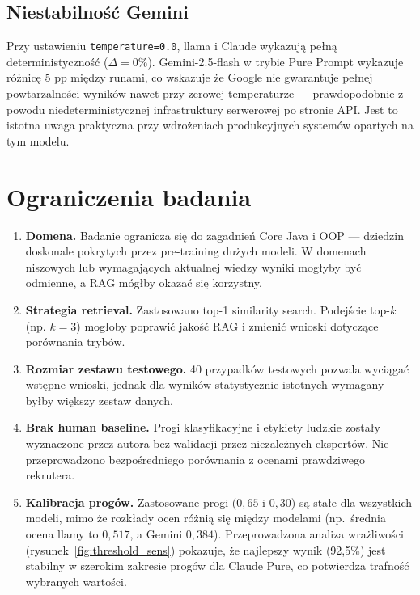 \documentclass[12pt, a4paper]{article}
\begin{document}
\subsection{Niestabilność Gemini}

Przy ustawieniu \texttt{temperature=0.0}, llama i Claude wykazują pełną deterministyczność
($\Delta = 0\%$). Gemini-2.5-flash w trybie Pure Prompt wykazuje różnicę 5 pp między
runami, co wskazuje że Google nie gwarantuje pełnej powtarzalności wyników nawet
przy zerowej temperaturze — prawdopodobnie z powodu niedeterministycznej infrastruktury
serwerowej po stronie API. Jest to istotna uwaga praktyczna przy wdrożeniach
produkcyjnych systemów opartych na tym modelu.

\section{Ograniczenia badania}

\begin{enumerate}
    \item \textbf{Domena.} Badanie ogranicza się do zagadnień Core Java i OOP —
          dziedzin doskonale pokrytych przez pre-training dużych modeli.
          W domenach niszowych lub wymagających aktualnej wiedzy wyniki
          mogłyby być odmienne, a RAG mógłby okazać się korzystny.

    \item \textbf{Strategia retrieval.} Zastosowano top-1 similarity search.
          Podejście top-$k$ (np. $k=3$) mogłoby poprawić jakość RAG i zmienić
          wnioski dotyczące porównania trybów.

    \item \textbf{Rozmiar zestawu testowego.} 40 przypadków testowych pozwala
          wyciągać wstępne wnioski, jednak dla wyników statystycznie istotnych
          wymagany byłby większy zestaw danych.

    \item \textbf{Brak human baseline.} Progi klasyfikacyjne i etykiety ludzkie
          zostały wyznaczone przez autora bez walidacji przez niezależnych ekspertów.
          Nie przeprowadzono bezpośredniego porównania z ocenami prawdziwego rekrutera.

    \item \textbf{Kalibracja progów.} Zastosowane progi ($0{,}65$ i $0{,}30$)
          są stałe dla wszystkich modeli, mimo że rozkłady ocen różnią się
          między modelami (np.\ średnia ocena llamy to $0{,}517$, a Gemini $0{,}384$).
          Przeprowadzona analiza wrażliwości (rysunek~\ref{fig:threshold_sens})
          pokazuje, że najlepszy wynik (92,5\%) jest stabilny w szerokim zakresie
          progów dla Claude Pure, co potwierdza trafność wybranych wartości.
\end{enumerate}
\end{document}
